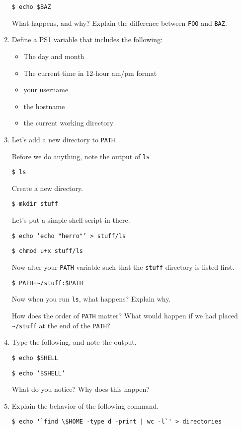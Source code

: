 \documentclass{article}
\begin{document}
\begin{enumerate}
		\texttt{\$ echo \$BAZ}

		What happens, and why? Explain the difference between \texttt{FOO} and \texttt{BAZ}.

	\item Define a PS1 variable that includes the following: 
		\begin{itemize}
			\item The day and month
			\item The current time in 12-hour am/pm format
			\item your username
			\item the hostname
			\item the current working directory
		\end{itemize}
	
	\item Let's add a new directory to \texttt{PATH}.

		Before we do anything, note the output of \texttt{ls} 

		\texttt{\$ ls} 

		Create a new directory.
		
		\texttt{\$ mkdir stuff}

		Let's put a simple shell script in there. 

		\texttt{\$ echo 'echo "herro"' > stuff/ls} 
		
		\texttt{\$ chmod u+x stuff/ls}

		Now alter your \texttt{PATH} variable such that the \texttt{stuff} directory is listed first.

		\texttt{\$ PATH=\textasciitilde/stuff:\$PATH} 

		Now when you run \texttt{ls}, what happens? Explain why. 
		
		How does the order of \texttt{PATH} matter? What would happen if we had placed \texttt{\textasciitilde/stuff} at the end of the \texttt{PATH}?
	
	\item Type the following, and note the output. 
		
		\texttt{\$ echo \$SHELL}

		\texttt{\$ echo '\$SHELL'}

		What do you notice? Why does this happen?
	\item Explain the behavior of the following command. 

	\begin{verbatim}$ echo '`find \$HOME -type d -print | wc -l`' > directories\end{verbatim}


\end{enumerate}
\end{document}
